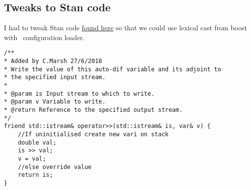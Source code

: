 \subsection{Tweaks to Stan code}
I had to tweak Stan code \href{https://github.com/stan-dev/math/blob/develop/stan/math/rev/core/var.hpp}{found here} so that we could use lexical cast from boost with \CNAME\ configuration loader.
\begin{lstlisting}
/**
* Added by C.Marsh 27/6/2018
* Write the value of this auto-dif variable and its adjoint to
* the specified input stream.
*
* @param is Input stream to which to write.
* @param v Variable to write.
* @return Reference to the specified output stream.
*/
friend std::istream& operator>>(std::istream& is, var& v) {
	//If uninitialised create new vari on stack
	double val;
	is >> val;
	v = val;
	//else override value
	return is;
}
\end{lstlisting}